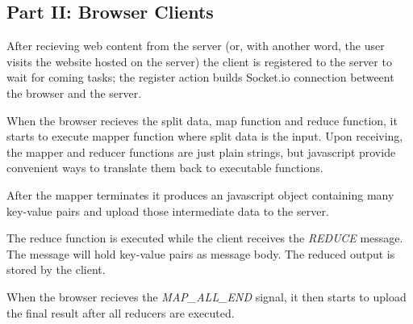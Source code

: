 \subsection{Part II: Browser Clients}

After recieving web content from the server (or, with another word, the user visits the website hosted on the server) the client is registered to the server to wait for coming tasks; the register action builds Socket.io connection betweent the browser and the server.

When the browser recieves the split data, map function and reduce function, it starts to execute mapper function where split data is the input. Upon receiving, the mapper and reducer functions are just plain strings, but javascript provide convenient ways to translate them back to executable functions.

After the mapper terminates it produces an javascript object containing many key-value pairs and upload those intermediate data to the server.

The reduce function is executed while the client receives the \emph{REDUCE} message. The message will hold key-value pairs as message body. The reduced output is stored by the client.

When the browser recieves the \emph{MAP\_ALL\_END} signal, it then starts to upload the final result after all reducers are executed.